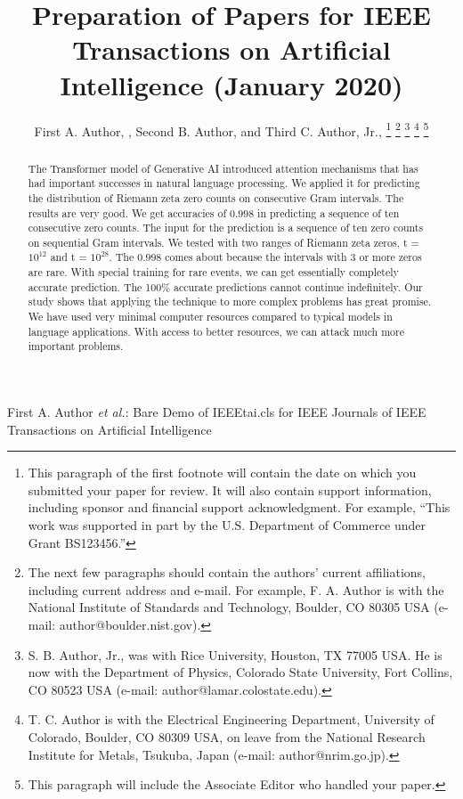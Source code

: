\documentclass[journal]{IEEEtai}
\begin{document}
\title{Preparation of Papers for IEEE {\sc Transactions on Artificial Intelligence} (January 2020)} 


\author{First A. Author, , Second B. Author, and Third C. Author, Jr., 
\thanks{This paragraph of the first footnote will contain the date on which you submitted your paper for review. It will also contain support information, including sponsor and financial support acknowledgment. For example, ``This work was supported in part by the U.S. Department of Commerce under Grant BS123456.'' }
\thanks{The next few paragraphs should contain the authors' current affiliations, including current address and e-mail. For example, F. A. Author is with the National Institute of Standards and Technology, Boulder, CO 80305 USA (e-mail: author@boulder.nist.gov).}
\thanks{S. B. Author, Jr., was with Rice University, Houston, TX 77005 USA. He is now with the Department of Physics, Colorado State University, Fort Collins, CO 80523 USA (e-mail: author@lamar.colostate.edu).}
\thanks{T. C. Author is with the Electrical Engineering Department, University of Colorado, Boulder, CO 80309 USA, on leave from the National Research Institute for Metals, Tsukuba, Japan (e-mail: author@nrim.go.jp).}
\thanks{This paragraph will include the Associate Editor who handled your paper.}}

{First A. Author \MakeLowercase{\textit{et al.}}: Bare Demo of IEEEtai.cls for IEEE Journals of IEEE Transactions on Artificial Intelligence}

\maketitle

\begin{abstract}
The Transformer model of Generative AI introduced attention mechanisms that has had important successes in natural language processing.  We applied it for predicting the distribution of Riemann zeta zero counts on consecutive Gram intervals. The results are very good. We get accuracies of $0.998$ in predicting a sequence of ten consecutive zero counts. The input for the prediction is a sequence of ten zero counts on sequential Gram intervals. We tested with two ranges of Riemann zeta zeros, t = $10^{12}$ and t = $10^{28}$. The $0.998$ comes about because the intervals with $3$ or more zeros are rare. With special training for rare events, we can get essentially completely accurate prediction. The 100\% accurate predictions cannot continue indefinitely. Our study shows that applying the technique to more complex problems has great promise. We have used very minimal computer resources compared to typical models in language applications. With access to better resources, we can attack much more important problems. 
\end{abstract}
\end{document}
